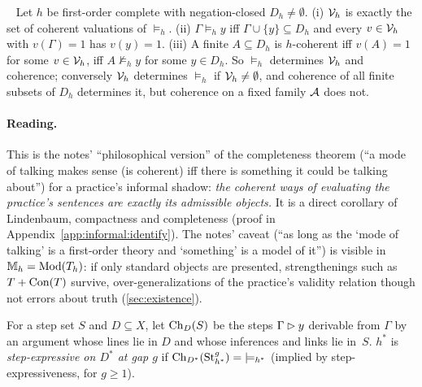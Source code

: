 \begin{lemma}\ \label{lem:informal:completeness}
Let $h$ be first-order complete with negation-closed $D_h\neq\emptyset$. (i) $\mathcal V_{h}$ is exactly the set of coherent valuations of ${\models_h}$. (ii) $\Gamma\models_hy$ iff $\Gamma\cup\{y\}\subseteq D_h$ and every $v\in\mathcal V_{h}$ with $v(\Gamma)=1$ has $v(y)=1$. (iii) A finite $A\subseteq D_h$ is $h$-coherent iff $v(A)=1$ for some $v\in\mathcal V_{h}$, iff $A\not\models_hy$ for some $y\in D_h$. So ${\models_h}$ determines $\mathcal V_{h}$ and coherence; conversely $\mathcal V_{h}$ determines ${\models_h}$ if $\mathcal V_{h}\ne\emptyset$, and coherence of all finite subsets of $D_h$ determines it, but coherence on a fixed family $\mathcal{A}$ does not.
\end{lemma}

\paragraph{Reading.}
This is the notes' ``philosophical version'' of the completeness theorem (``a mode of talking makes sense (is coherent) iff there is something it could be talking about'') for a practice's informal shadow: \emph{the coherent ways of evaluating the practice's sentences are exactly its admissible objects.} It is a direct corollary of Lindenbaum, compactness and completeness \citep{godel1930vollstandigkeit} (proof in Appendix~\ref{app:informal:identify}). The notes' caveat (``as long as the `mode of talking' is a first-order theory and `something' is a model of it'') is visible in $\mathbb M_h=\mathrm{Mod}(T_h)$: if only standard objects are presented, strengthenings such as $T+\mathrm{Con}(T)$ survive, over-generalizations of the practice's validity relation though not errors about truth (\cref{sec:existence}).

For a step set $S$ and $D\subseteq X$, let $\mathrm{Ch}_D(S)$ be the steps $\Gamma\rhd y$ derivable from $\Gamma$ by an argument whose lines lie in $D$ and whose inferences and links lie in~$S$. $h^*$ is \emph{step-expressive on $D^*$ at gap $g$} if $\mathrm{Ch}_{D^*}(\mathrm{St}^{g}_{h^*})={\models_{h^*}}$ (implied by step-expressiveness, for $g\ge1$).


